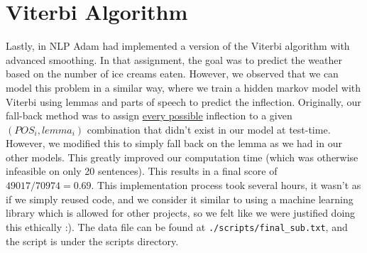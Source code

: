 \documentclass{article}
\begin{document}
    \section{Viterbi Algorithm}
        Lastly, in NLP Adam had implemented a version of the Viterbi algorithm with advanced smoothing. In that assignment, the goal was to predict the weather based on the number of ice creams eaten. However,
        we observed that we can model this problem in a similar way, where we train a hidden markov model with Viterbi using lemmas and parts of speech to predict the inflection. Originally, our fall-back method
        was to assign \underline{every possible} inflection to a given $(POS_i, lemma_i)$ combination that didn't exist in our model at test-time. However, we modified this to simply fall back on the
        lemma as we had in our other models. This greatly improved our computation time (which was otherwise infeasible on only 20 sentences). This results in a final score of $\boxed{49017 / 70974 = 0.69}$. This implementation process took several hours, it wasn't as if we 
        simply reused code, and we consider it similar to using a machine learning library which is allowed for other projects, so we felt like we were justified doing this ethically :). 
        The data file can be found at \texttt{./scripts/final\_sub.txt}, and the script is under the scripts directory.
\end{document}
